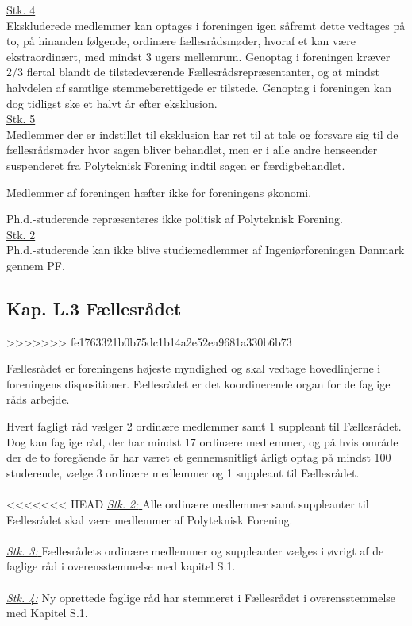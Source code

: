 \begin{list}
\underline{Stk. 4}\\
Ekskluderede medlemmer kan optages i foreningen igen såfremt dette vedtages på to, på hinanden følgende, ordinære fællesrådsmøder, hvoraf et kan være ekstraordinært, med mindst 3 ugers mellemrum. Genoptag i foreningen kræver 2/3 flertal blandt de tilstedeværende Fællesrådsrepræsentanter, og at mindst halvdelen af samtlige stemmeberettigede er tilstede. Genoptag i foreningen kan dog tidligst ske et halvt år efter eksklusion.\\

\underline{Stk. 5}\\
Medlemmer der er indstillet til eksklusion har ret til at tale og forsvare sig til de fællesrådsmøder hvor sagen bliver behandlet, men er i alle andre henseender suspenderet fra Polyteknisk Forening indtil sagen er færdigbehandlet.
\item Medlemmer af foreningen hæfter ikke for foreningens økonomi.
\item \label{L:medlem:PHD} Ph.d.-studerende repræsenteres ikke politisk af Polyteknisk Forening.\\

\underline{Stk. 2}\\
Ph.d.-studerende kan ikke blive studiemedlemmer af Ingeniørforeningen Danmark gennem PF.


\subsection*{Kap. L.3 Fællesrådet}
\label{L:kap:faellesraadet}
>>>>>>> fe1763321b0b75dc1b14a2e52ea9681a330b6b73
\item Fællesrådet er foreningens højeste myndighed og skal vedtage hovedlinjerne i foreningens dispositioner. Fællesrådet er det koordinerende organ for de faglige råds arbejde.

\item \label{L:FR:ValgtilFR} Hvert fagligt råd vælger 2 ordinære medlemmer samt 1 suppleant til Fællesrådet. Dog kan faglige råd, der har mindst 17 ordinære medlemmer, og på hvis område der de to foregående år har været et gennemsnitligt årligt optag på mindst 100 studerende, vælge 3 ordinære medlemmer og 1 suppleant til Fællesrådet.\\
\\
<<<<<<< HEAD
\underline{\textit{Stk. 2: }} Alle ordinære medlemmer samt suppleanter til Fællesrådet skal være medlemmer af Polyteknisk Forening.\\
\\
\underline{\textit{Stk. 3: }} Fællesrådets ordinære medlemmer og suppleanter vælges i øvrigt af de faglige råd i overensstemmelse med kapitel S.1.
\\
\\
\underline{\textit{Stk. 4:}} Ny oprettede faglige råd har stemmeret i Fællesrådet i overensstemmelse med Kapitel S.1.


\end{list}
